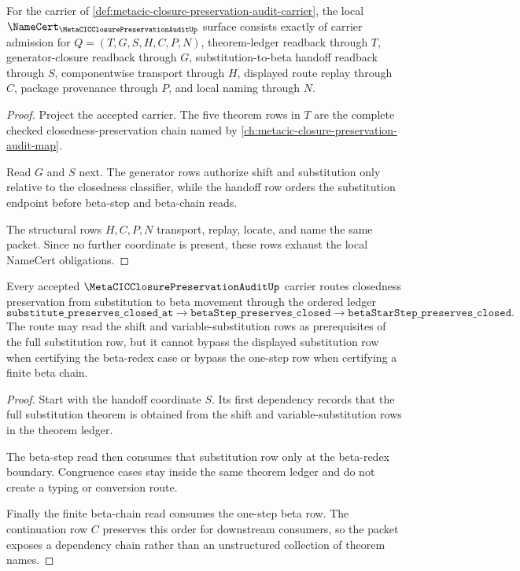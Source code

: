 \begin{theorem}
\label{thm:metacic-closure-preservation-audit-namecert-obligations}
For the carrier of \autoref{def:metacic-closure-preservation-audit-carrier}, the local $\NameCert_{\MetaCICClosurePreservationAuditUp}$ surface consists exactly of carrier admission for $Q=(T,G,S,H,C,P,N)$, theorem-ledger readback through $T$, generator-closure readback through $G$, substitution-to-beta handoff readback through $S$, componentwise transport through $H$, displayed route replay through $C$, package provenance through $P$, and local naming through $N$.
\end{theorem}
\begin{proof}
Project the accepted carrier. The five theorem rows in $T$ are the complete checked closedness-preservation chain named by \autoref{ch:metacic-closure-preservation-audit-map}.

Read $G$ and $S$ next. The generator rows authorize shift and substitution only relative to the closedness classifier, while the handoff row orders the substitution endpoint before beta-step and beta-chain reads.

The structural rows $H,C,P,N$ transport, replay, locate, and name the same packet. Since no further coordinate is present, these rows exhaust the local NameCert obligations.
\end{proof}

\begin{theorem}
\label{thm:metacic-closure-preservation-audit-substitution-beta-chain}
Every accepted $\MetaCICClosurePreservationAuditUp$ carrier routes closedness preservation from substitution to beta movement through the ordered ledger
$$
\texttt{substitute\_preserves\_closed\_at}
\longrightarrow
\texttt{betaStep\_preserves\_closed}
\longrightarrow
\texttt{betaStarStep\_preserves\_closed}.
$$
The route may read the shift and variable-substitution rows as prerequisites of the full substitution row, but it cannot bypass the displayed substitution row when certifying the beta-redex case or bypass the one-step row when certifying a finite beta chain.
\end{theorem}
\begin{proof}
Start with the handoff coordinate $S$. Its first dependency records that the full substitution theorem is obtained from the shift and variable-substitution rows in the theorem ledger.

The beta-step read then consumes that substitution row only at the beta-redex boundary. Congruence cases stay inside the same theorem ledger and do not create a typing or conversion route.

Finally the finite beta-chain read consumes the one-step beta row. The continuation row $C$ preserves this order for downstream consumers, so the packet exposes a dependency chain rather than an unstructured collection of theorem names.
\end{proof}


